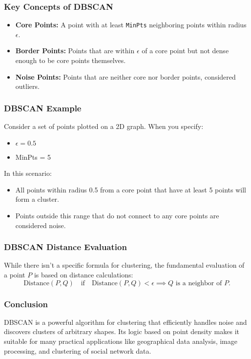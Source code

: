 \documentclass[aspectratio=169]{beamer}
\begin{document}
\begin{frame}[fragile]
    \frametitle{Key Concepts of DBSCAN}
    \begin{itemize}
        \item \textbf{Core Points:} A point with at least \texttt{MinPts} neighboring points within radius $\epsilon$.
        \item \textbf{Border Points:} Points that are within $\epsilon$ of a core point but not dense enough to be core points themselves.
        \item \textbf{Noise Points:} Points that are neither core nor border points, considered outliers.
    \end{itemize}
\end{frame}

\begin{frame}[fragile]
    \frametitle{DBSCAN Example}
    Consider a set of points plotted on a 2D graph. When you specify:
    \begin{itemize}
        \item $\epsilon = 0.5$
        \item MinPts = 5
    \end{itemize}
    In this scenario:
    \begin{itemize}
        \item All points within radius 0.5 from a core point that have at least 5 points will form a cluster.
        \item Points outside this range that do not connect to any core points are considered noise.
    \end{itemize}
\end{frame}

\begin{frame}[fragile]
    \frametitle{DBSCAN Distance Evaluation}
    While there isn't a specific formula for clustering, the fundamental evaluation of a point \(P\) is based on distance calculations:
    \begin{equation}
        \text{Distance}(P, Q) \quad \text{if} \quad \text{Distance}(P, Q) < \epsilon \implies Q \text{ is a neighbor of } P.
    \end{equation}
\end{frame}

\begin{frame}[fragile]
    \frametitle{Conclusion}
    DBSCAN is a powerful algorithm for clustering that efficiently handles noise and discovers clusters of arbitrary shapes. Its logic based on point density makes it suitable for many practical applications like geographical data analysis, image processing, and clustering of social network data.
\end{frame}
\end{document}
